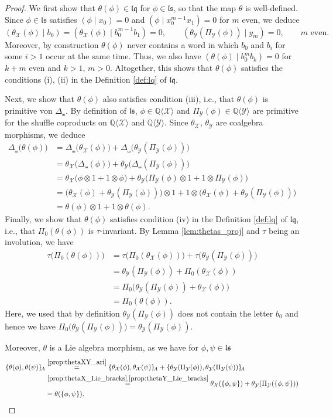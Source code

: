\documentclass[12pt,reqno]{amsart}
\numberwithin{equation}{section}
\theoremstyle{definition}
\newcommand{\QQ}{\mathbb{Q}}
\newcommand{\X}{\mathcal{X}}
\newcommand{\QX}{\QQ\langle \X\rangle}
\newcommand{\Y}{\mathcal{Y}}
\newcommand{\QY}{\QQ\langle \Y\rangle}
\newcommand{\ls}{\mathfrak{ls}}
\newcommand{\lqq}{\mathfrak{lq}}
\newcommand{\ari}[2]{\{#1,#2\}\!_A}
\newcommand{\shco}{\Delta_{\shuffle}}
\newcommand{\pizero}{\Pi_0}
\newcommand{\piY}{\Pi_\Y}
\newcommand{\thetaX}{\theta_\X}
\newcommand{\thetaY}{\theta_\Y}
\begin{document}
\begin{proof}
We first show that $\theta(\phi)\in \lqq$ for $\phi\in\ls$, so that the map $\theta$ is well-defined. Since $\phi\in \ls$ satisfies $(\phi\mid x_0)=0$ and $(\phi\mid x_0^{m-1}x_1)=0$ for $m$ even, we deduce
\[(\thetaX(\phi)\mid b_0)=(\thetaX(\phi)\mid b_0^{m-1}b_1)=0,\qquad (\thetaY(\piY(\phi))\mid y_m)=0, \qquad m \text{ even}.\]
Moreover, by construction $\theta(\phi)$ never contains a word in which $b_0$ and $b_i$ for some $i>1$ occur at the same time. Thus, we also have $(\theta(\phi)\mid b_0^mb_k)=0$ for $k+m$ even and $k>1$, $m>0$. Altogether, this shows that $\theta(\phi)$ satisfies the conditions (i), (ii) in the Definition \ref{def:lq} of $\lqq$.

Next, we show that $\theta(\phi)$ also satisfies condition (iii), i.e., that $\theta(\phi)$ is primitive von $\shco$. By definition of $\ls$, $\phi\in \QX$ and $\piY(\phi)\in \QY$ are primitive for the shuffle coproducts on $\QX$ and $\QY$. Since $\thetaX$, $\thetaY$ are coalgebra morphisms, we deduce
\begin{align*}
\shco\big(\theta(\phi)\big)&=\shco\big(\thetaX(\phi)\big)+\shco\big(\thetaY(\piY(\phi))\big) \\
&=\thetaX\big(\shco(\phi)\big)+\thetaY\big(\shco(\piY(\phi))\big) \\
&=\thetaX\big(\phi\otimes 1+1\otimes \phi\big)+\thetaY\big(\piY(\phi)\otimes1+1\otimes\piY(\phi)\big)\\
&=\big(\thetaX(\phi)+\thetaY(\piY(\phi))\big)\otimes1+1\otimes\big(\thetaX(\phi)+\thetaY(\piY(\phi))\big) \\
&=\theta(\phi)\otimes1 +1\otimes\theta(\phi).
\end{align*}
Finally, we show that $\theta(\phi)$ satisfies condition (iv) in the Definition \ref{def:lq} of $\lqq$, i.e., that $\pizero(\theta(\phi))$ is $\tau$-invariant. By Lemma \ref{lem:thetas_proj} and $\tau$ being an involution, we have
\begin{align*}
\tau\big(\pizero(\theta(\phi))\big)&=\tau\big(\pizero(\thetaX(\phi))\big)+\tau\big(\thetaY(\piY(\phi))\big) \\
&=\thetaY(\piY(\phi))+\pizero(\thetaX(\phi)) \\
&=\pizero\big(\thetaY(\piY(\phi))+\thetaX(\phi) \big) \\
&=\pizero(\theta(\phi)).
\end{align*}
Here, we used that by definition $\thetaY(\piY(\phi))$ does not contain the letter $b_0$ and hence we have $\pizero\big(\thetaY(\piY(\phi))\big)=\thetaY(\piY(\phi))$.

Moreover, $\theta$ is a Lie algebra morphism, as we have for $\phi,\psi\in\ls$
\begin{align*}
\ari{\theta(\phi)}{\theta(\psi)}&\overset{\ref{prop:thetaXY_ari}}{=}\ari{\thetaX(\phi)}{\thetaX(\psi)}+\ari{\thetaY(\piY(\phi))}{\thetaY(\piY(\psi))}\\
&\overset{\ref{prop:thetaX_Lie_bracks},\ref{prop:thetaY_Lie_bracks}}{=} \thetaX(\{\phi,\psi\})+\thetaY(\piY(\{\phi,\psi\})) \\
&=\theta(\{\phi,\psi\}).
\qedhere \end{align*}
\end{proof}
\end{document}
